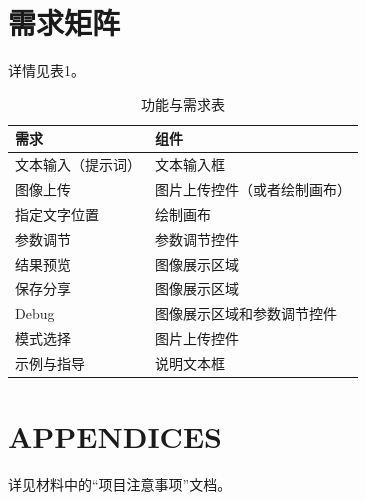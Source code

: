 \documentclass[a4paper,12pt]{article}
\begin{document}
\section{需求矩阵}
详情见表1。
\begin{table}[htbp]
    \centering
    \begin{tabular}{|p{4cm}|p{10cm}|}
      \hline
      \textbf{需求} & \textbf{组件} \\
      \hline
      文本输入（提示词）
        & 文本输入框 \\
      \hline
      图像上传
        &  图片上传控件（或者绘制画布）\\
      \hline
      指定文字位置
        & 绘制画布 \\
      \hline
      参数调节
        & 参数调节控件 \\
      \hline
      结果预览
        & 图像展示区域 \\
      \hline
      保存分享
        & 图像展示区域 \\
      \hline
      Debug
        & 图像展示区域和参数调节控件 \\
      \hline
      模式选择
        & 图片上传控件 \\
      \hline
      示例与指导
        & 说明文本框 \\
      \hline
    \end{tabular}
    \caption{功能与需求表}
\end{table}
  

\section{APPENDICES}
详见材料中的“项目注意事项”文档。
\end{document}
